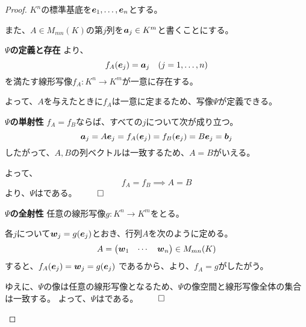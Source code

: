 \documentclass[../../../topic_linear-algebra]{subfiles}
\begin{document}
\begin{proof}
  $K^n$の標準基底を$\vb*{e}_1,\dots,\vb*{e}_n$とする。

  また、$A\in M_{mn}(K)$の第$j$列を$\vb*{a}_j\in K^m$と書くことにする。
  
  \begin{subpattern}{\bfseries $\Psi$の定義と存在}
    より、
    \begin{equation*}
      f_A(\vb*{e}_j) = \vb*{a}_j \quad (j=1,\dots,n)
    \end{equation*}
    を満たす線形写像$f_A\colon K^n\to K^m$が一意に存在する。
    
    よって、$A$を与えたときに$f_A$は一意に定まるため、写像$\Psi$が定義できる。
  \end{subpattern}
  
  \begin{subpattern}{\bfseries $\Psi$の単射性}
    $f_A=f_B$ならば、すべての$j$について次が成り立つ。
    \begin{equation*}
      \vb*{a}_j = A\vb*{e}_j =f_A(\vb*{e}_j)=f_B(\vb*{e}_j)=B\vb*{e}_j = \vb*{b}_j
    \end{equation*}
    したがって、$A,B$の列ベクトルは一致するため、$A=B$がいえる。
    
    よって、
    \begin{equation*}
      f_A = f_B \implies A = B
    \end{equation*}
    より、$\Psi$はである。 $\qed$
  \end{subpattern}
  
  \begin{subpattern}{\bfseries $\Psi$の全射性}
    任意の線形写像$g\colon K^n \to K^m$をとる。
    
    各$j$について$\vb*{w}_j=g(\vb*{e}_j)$とおき、行列$A$を次のように定める。
    \begin{equation*}
      A= \begin{pmatrix}
        \vb*{w}_1 & \cdots & \vb*{w}_n
      \end{pmatrix} \in M_{mn}(K)
    \end{equation*}
    すると、$f_A(\vb*{e}_j)=\vb*{w}_j=g(\vb*{e}_j)$ であるから、より、$f_A=g$がしたがう。
    
    \br
    
    ゆえに、$\Psi$の像は任意の線形写像となるため、$\Psi$の像空間と線形写像全体の集合は一致する。
    よって、$\Psi$はである。 $\qed$
  \end{subpattern}
  

\end{proof}
\end{document}
